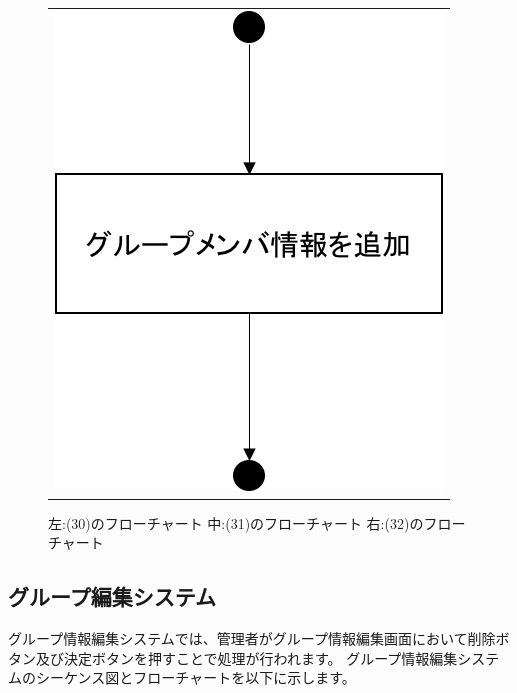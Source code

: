 \begin{figure}[htbp]
\begin{tabular}{c}
\begin{minipage}{0.33\hsize}
\begin{center}
   \includegraphics[width=0.8\linewidth,clip]{./img/flow/32.png}
  \end{center}
 \end{minipage}
\end{tabular}
 \caption{左:(30)のフローチャート 中:(31)のフローチャート 右:(32)のフローチャート}\label{fig:30to31to32}
\end{figure}


\clearpage



\subsection{グループ編集システム}
グループ情報編集システムでは、管理者がグループ情報編集画面において削除ボタン及び決定ボタンを押すことで処理が行われます。
グループ情報編集システムのシーケンス図とフローチャートを以下に示します。

